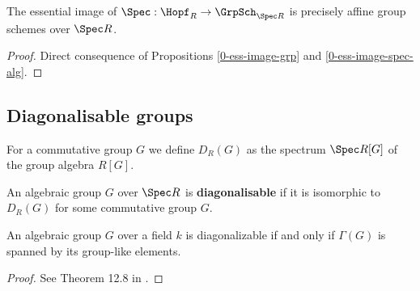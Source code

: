 \begin{proposition}
  \label{0-ess-image-spec-hopf}
  \leanok

  The essential image of $\Spec : \Hopf_R \to \GrpSch_{\Spec R}$ is precisely affine group schemes over $\Spec R$.
\end{proposition}
\begin{proof}
  \leanok

  Direct consequence of Propositions \ref{0-ess-image-grp} and \ref{0-ess-image-spec-alg}.
\end{proof}


\subsection{Diagonalisable groups}


\begin{definition}
  \label{0-diag}
  \leanok

  For a commutative group $G$ we define $D_R(G)$ as the spectrum $\Spec R[G]$ of the group algebra $R[G]$.
\end{definition}


\begin{definition}
  \label{0-is-diag}

  An algebraic group $G$ over $\Spec R$ is {\bf diagonalisable} if it is isomorphic to $D_R(G)$ for some commutative group $G$.
\end{definition}


\begin{theorem}
  \label{0-diag-iff-grp-like-span}
  \leanok

  An algebraic group $G$ over a field $k$ is diagonalizable if and only if $\Gamma(G)$ is spanned by its group-like elements.
\end{theorem}
\begin{proof}

  See Theorem 12.8 in \cite{Milne_2017}.
\end{proof}


